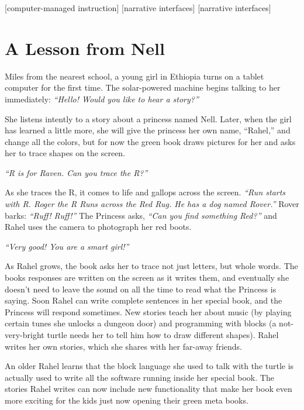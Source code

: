 \documentclass{acm_proc_article-sp}
\begin{document}
[computer-managed instruction]
[narrative interfaces]
[narrative interfaces]


\section{A Lesson from Nell}

Miles from the nearest school, a young girl in Ethiopia turns on a
tablet computer for the first time.  The solar-powered machine begins
talking to her immediately: \textit{``Hello!  Would you like to hear a story?''}

She listens intently to a story about a princess named Nell.  Later, when
the girl has learned a little more, she will give the princess her own
name, ``Rahel,'' and change all the colors, but for now the green
book draws pictures for her and asks her to trace shapes on the screen.

\textit{``R is for Raven.  Can you trace the R?''}

As she traces the R, it comes to life and gallops across the screen.
\textit{``Run starts with R.  Roger the R Runs across the Red Rug.  He has a
dog named Rover.''}  Rover barks: \textit{``Ruff! Ruff!''}  The Princess asks,
\textit{``Can you find something Red?''} and Rahel uses the camera to
photograph her red boots.

\textit{``Very good!  You are a smart girl!''}

As Rahel grows, the book asks her to trace not just letters, but whole
words.   The books responses are written on the screen as it writes
them, and eventually she doesn't need to leave the sound on all the
time to read what the Princess is saying.  Soon Rahel can write
complete sentences in her special book, and the Princess will respond
sometimes.  New stories teach her about music (by playing certain
tunes she unlocks a dungeon door) and programming with blocks (a
not-very-bright turtle needs her to tell him how to draw different
shapes).  Rahel writes her own stories, which she shares with her
far-away friends.

An older Rahel learns that the block language she used to talk with
the turtle is actually used to write all the software running inside
her special book.  The stories Rahel writes can now include new
functionality that make her book even more exciting for the kids
just now opening their green meta books.
\end{document}
